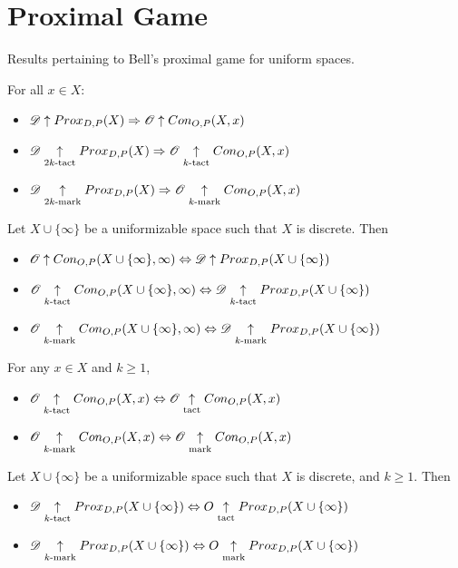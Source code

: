 
\chapter{Proximal Game}

Results pertaining to Bell's proximal game for uniform spaces.



\begin{thm}
For all $x\in X$:
  \begin{itemize}
    \item
      $\mathscr{D}\uparrow Prox_{D,P}(X) \Rightarrow \mathscr{O} \uparrow Con_{O,P}(X,x)$
    \item
      $\mathscr{D}\underset{2k\text{-tact}}{\uparrow} Prox_{D,P}(X) \Rightarrow \mathscr{O} \underset{k\text{-tact}}{\uparrow} Con_{O,P}(X,x)$
    \item
      $\mathscr{D}\underset{2k\text{-mark}}{\uparrow} Prox_{D,P}(X) \Rightarrow \mathscr{O} \underset{k\text{-mark}}{\uparrow} Con_{O,P}(X,x)$
  \end{itemize}
\end{thm}

\begin{thm}
  Let $X\cup\{\infty\}$ be a uniformizable space such that $X$ is discrete. Then
  \begin{itemize}
    \item
      $\mathscr{O}\uparrow Con_{O,P}(X\cup\{\infty\},\infty) \Leftrightarrow \mathscr{D} \uparrow Prox_{D,P}(X\cup\{\infty\})$
    \item
      $\mathscr{O}\underset{k\text{-tact}}{\uparrow} Con_{O,P}(X\cup\{\infty\},\infty) \Leftrightarrow \mathscr{D} \underset{k\text{-tact}}{\uparrow} Prox_{D,P}(X\cup\{\infty\})$
    \item
      $\mathscr{O}\underset{k\text{-mark}}{\uparrow} Con_{O,P}(X\cup\{\infty\},\infty) \Leftrightarrow \mathscr{D} \underset{k\text{-mark}}{\uparrow} Prox_{D,P}(X\cup\{\infty\})$
  \end{itemize}
\end{thm}

\begin{prop} For any $x\in X$ and $k\geq 1$,
  \begin{itemize}
    \item
      $\mathscr{O}\underset{k\text{-tact}}{\uparrow}Con_{O,P}(X,x) \Leftrightarrow \mathscr{O}\underset{\text{tact}}{\uparrow}Con_{O,P}(X,x)$
    \item
      $\mathscr{O}\underset{k\text{-mark}}{\uparrow}Con_{O,P}(X,x) \Leftrightarrow \mathscr{O}\underset{\text{mark}}{\uparrow}Con_{O,P}(X,x)$
  \end{itemize}
\end{prop}

\begin{cor}
  Let $X\cup\{\infty\}$ be a uniformizable space such that $X$ is discrete, and $k\geq 1$. Then
  \begin{itemize}
    \item
      $\mathscr{D}\underset{k\text{-tact}}{\uparrow}Prox_{D,P}(X\cup\{\infty\}) \Leftrightarrow O\underset{\text{tact}}{\uparrow}Prox_{D,P}(X\cup\{\infty\})$
    \item
      $\mathscr{D}\underset{k\text{-mark}}{\uparrow}Prox_{D,P}(X\cup\{\infty\}) \Leftrightarrow O\underset{\text{mark}}{\uparrow}Prox_{D,P}(X\cup\{\infty\})$
  \end{itemize}
\end{cor}

